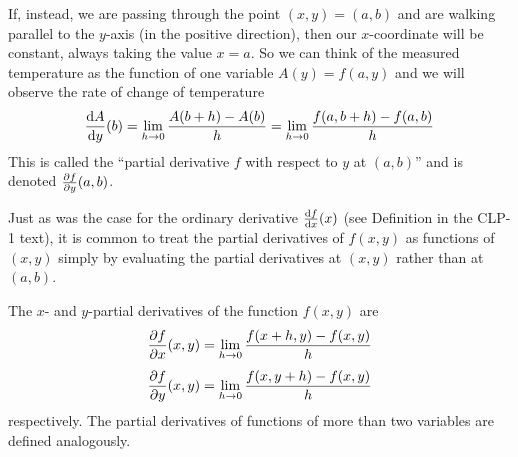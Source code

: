 If, instead, we are passing through the point $(x,y)=(a,b)$ and 
are walking parallel to the $y$-axis (in the positive direction), 
then our $x$-coordinate will be constant, always taking the value $x=a$. 
So we can think of the measured temperature as the function of one 
variable $A(y) = f(a,y)$ and we will observe the rate of change of temperature 
\begin{equation*}
\diff{A}{y}(b) = \lim_{h\rightarrow 0}\frac{A(b+h) - A(b)}{h}
      = \lim_{h\rightarrow 0}\frac{f(a,b+h) - f(a,b)}{h}
\end{equation*}
This is called the ``partial derivative $f$ with respect to $y$ at $(a,b)$''
and is denoted $\pdiff{f}{y}(a,b)$.

Just as was the case for the ordinary derivative $\diff{f}{x}(x)$
(see Definition  in the CLP-1 text),
it is common to treat the partial derivatives of $f(x,y)$ as functions
of $(x,y)$ simply by evaluating the partial derivatives at $(x,y)$ rather 
than at $(a,b)$.
\begin{defn}\label{def partials}
The $x$- and $y$-partial derivatives of the function $f(x,y)$
are
\begin{align*}
\pdiff{f}{x}(x,y)
  &= \lim_{h\rightarrow 0}\frac{f(x+h,y) - f(x,y)}{h} \\[0.05in]
\pdiff{f}{y}(x,y)
  &= \lim_{h\rightarrow 0}\frac{f(x,y+h) - f(x,y)}{h} 
\end{align*}
respectively. The partial derivatives of functions of more than two variables
are defined analogously.
\end{defn}


